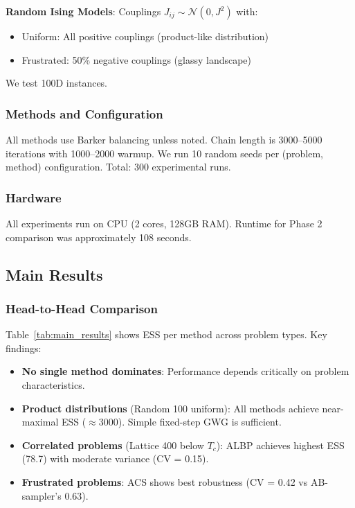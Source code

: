 \documentclass{article}
\begin{document}
\textbf{Random Ising Models}: Couplings $J_{ij} \sim \mathcal{N}(0, J^2)$ with:
\begin{itemize}
    \item Uniform: All positive couplings (product-like distribution)
    \item Frustrated: 50\% negative couplings (glassy landscape)
\end{itemize}
We test 100D instances.

\subsubsection{Methods and Configuration}

All methods use Barker balancing unless noted. Chain length is 3000--5000 iterations with 1000--2000 warmup. We run 10 random seeds per (problem, method) configuration. Total: 300 experimental runs.

\subsubsection{Hardware}

All experiments run on CPU (2 cores, 128GB RAM). Runtime for Phase 2 comparison was approximately 108 seconds.

\subsection{Main Results}

\subsubsection{Head-to-Head Comparison}

Table~\ref{tab:main_results} shows ESS per method across problem types. Key findings:

\begin{itemize}
    \item \textbf{No single method dominates}: Performance depends critically on problem characteristics.
    \item \textbf{Product distributions} (Random 100 uniform): All methods achieve near-maximal ESS ($\approx 3000$). Simple fixed-step GWG is sufficient.
    \item \textbf{Correlated problems} (Lattice 400 below $T_c$): ALBP achieves highest ESS (78.7) with moderate variance (CV = 0.15).
    \item \textbf{Frustrated problems}: ACS shows best robustness (CV = 0.42 vs AB-sampler's 0.63).
\end{itemize}
\end{document}
